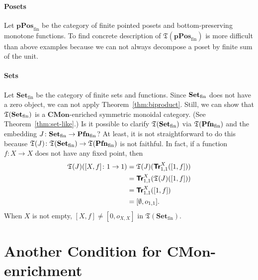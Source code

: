 \paragraph{Posets}

Let $\mathbf{pPos}_{\mathrm{fin}}$ be the category of finite
pointed posets and bottom-preserving monotone functions.
To find concrete description of $\mathfrak{T}(\mathbf{pPos}_{\mathrm{fin}})$ is more
difficult than above examples because we can not always
decompose a poset by finite sum of the unit.

\paragraph{Sets}

Let $\mathbf{Set}_{\mathrm{fin}}$ be the category of finite sets and
functions. Since $\mathbf{Set}_{\mathrm{fin}}$ does not have a zero object, we can not
apply Theorem~\ref{thm:biproduct}. Still, we can show that
$\mathfrak{T}(\mathbf{Set}_{\mathrm{fin}})$ is a $\mathbf{CMon}$-enriched symmetric
monoidal category. (See Theorem~\ref{thm:set-like}.) Is it possible to
clarify $\mathfrak{T}(\mathbf{Set}_{\mathrm{fin}})$ via $\mathfrak{T}(\mathbf{Pfn}_{\mathrm{fin}})$ and the
embedding $J \colon \mathbf{Set}_{\mathrm{fin}} \to \mathbf{Pfn}_{\mathrm{fin}}$? At
least, it is not straightforward to do this because
$\mathfrak{T}(J) \colon \mathfrak{T}(\mathbf{Set}_{\mathrm{fin}}) \to
\mathfrak{T}(\mathbf{Pfn}_{\mathrm{fin}})$ is not faithful. In fact, if a function
$f \colon X \to X$ does not have any fixed point, then
\begin{align*}
  \mathfrak{T}(J)([X,f] \colon 1 \to 1)
  &= \mathfrak{T}(J)({\normalfont\textsf{\textbf{Tr}}}^{X}_{1,1} ([1,f])) \\
  &= {\normalfont\textsf{\textbf{Tr}}}^{X}_{1,1} (\mathfrak{T}(J)([1,f])) \\
  &= {\normalfont\textsf{\textbf{Tr}}}^{X}_{1,1} ([1,f]) \\
  &= [\emptyset,o_{1,1}].
\end{align*}
When $X$ is not empty, $[X,f] \neq [0,o_{X,X}]$ in $\mathfrak{T}(\mathbf{Set}_{\mathrm{fin}})$.


\section{Another Condition for $\mathbf{CMon}$-enrichment}


